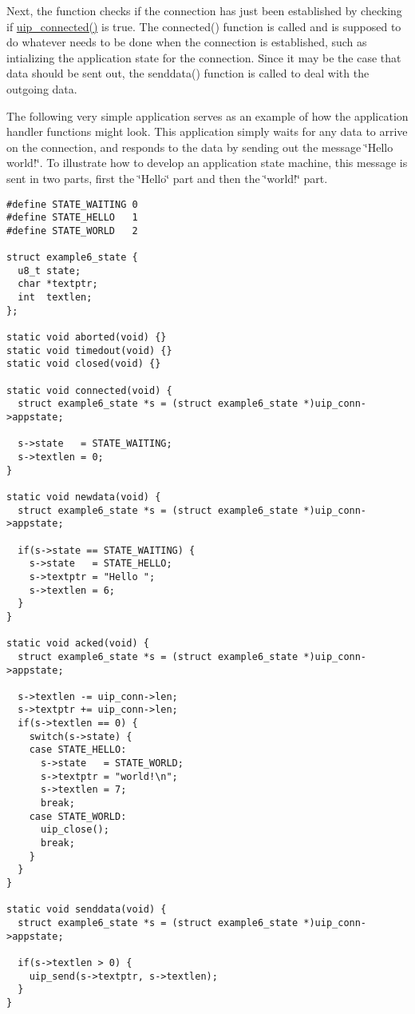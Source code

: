 Next, the function checks if the connection has just been established by checking if \hyperlink{a00064_gdb971fb1525d0c5002f52125b05f3218}{uip\_\-connected()} is true. The connected() function is called and is supposed to do whatever needs to be done when the connection is established, such as intializing the application state for the connection. Since it may be the case that data should be sent out, the senddata() function is called to deal with the outgoing data.

The following very simple application serves as an example of how the application handler functions might look. This application simply waits for any data to arrive on the connection, and responds to the data by sending out the message \char`\"{}Hello world!\char`\"{}. To illustrate how to develop an application state machine, this message is sent in two parts, first the \char`\"{}Hello\char`\"{} part and then the \char`\"{}world!\char`\"{} part.



\footnotesize\begin{verbatim}#define STATE_WAITING 0
#define STATE_HELLO   1
#define STATE_WORLD   2

struct example6_state {
  u8_t state;
  char *textptr;
  int  textlen;
};

static void aborted(void) {}
static void timedout(void) {}
static void closed(void) {}

static void connected(void) {
  struct example6_state *s = (struct example6_state *)uip_conn->appstate;

  s->state   = STATE_WAITING;
  s->textlen = 0;
}

static void newdata(void) {
  struct example6_state *s = (struct example6_state *)uip_conn->appstate;

  if(s->state == STATE_WAITING) {
    s->state   = STATE_HELLO;
    s->textptr = "Hello ";
    s->textlen = 6;
  }
}

static void acked(void) {
  struct example6_state *s = (struct example6_state *)uip_conn->appstate;
  
  s->textlen -= uip_conn->len;
  s->textptr += uip_conn->len;
  if(s->textlen == 0) {
    switch(s->state) {
    case STATE_HELLO:
      s->state   = STATE_WORLD;
      s->textptr = "world!\n";
      s->textlen = 7;
      break;
    case STATE_WORLD:
      uip_close();
      break;
    }
  }
}

static void senddata(void) {
  struct example6_state *s = (struct example6_state *)uip_conn->appstate;

  if(s->textlen > 0) {
    uip_send(s->textptr, s->textlen);
  }
}
\end{verbatim}
\normalsize


